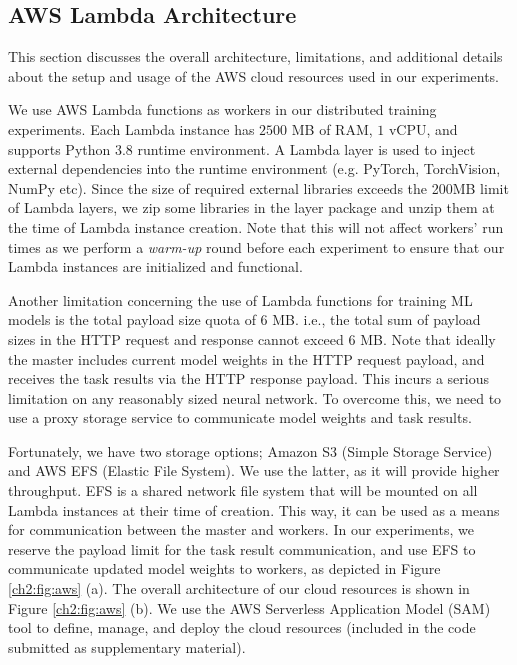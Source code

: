 \FloatBarrier


\subsection{AWS Lambda Architecture}\label{ch2:sec:lambda}

This section discusses the overall architecture, limitations, and additional details about the setup and usage of the AWS cloud resources used in our experiments. 

We use AWS Lambda functions as workers in our distributed training experiments. Each Lambda instance has $2500$ MB of RAM, $1$ vCPU, and supports Python 3.8 runtime environment. A Lambda layer is used to inject external dependencies into the runtime environment (e.g. PyTorch, TorchVision, NumPy etc). Since the size of required external libraries exceeds the 200MB limit of Lambda layers, we zip some libraries in the layer package and unzip them at the time of Lambda instance creation. Note that this will not affect workers' run times as we perform a \textit{warm-up} round before each experiment to ensure that our Lambda instances are initialized and functional. 

Another limitation concerning the use of Lambda functions for training ML models is the total payload size quota of $6$ MB. i.e., the total sum of payload sizes in the HTTP request and response cannot exceed $6$ MB. Note that ideally the master includes current model weights in the HTTP request payload, and receives the task results via the HTTP response payload. This incurs a serious limitation on any reasonably sized neural network. To overcome this, we need to use a proxy storage service to communicate model weights and task results.

Fortunately, we have two storage options; Amazon S3 (Simple Storage Service) and AWS EFS (Elastic File System). We use the latter, as it will provide higher throughput. EFS is a shared network file system that will be mounted on all Lambda instances at their time of creation. This way, it can be used as a means for communication between the master and workers. In our experiments, we reserve the payload limit for the task result communication, and use EFS to communicate updated model weights to workers, as depicted in Figure \ref{ch2:fig:aws} (a). The overall architecture of our cloud resources is shown in Figure \ref{ch2:fig:aws} (b). We use the AWS Serverless Application Model (SAM) tool to define, manage, and deploy the cloud resources (included in the code submitted as supplementary material).  

